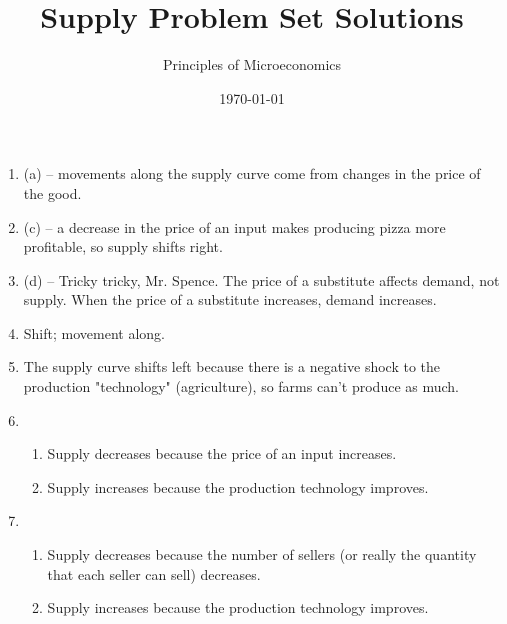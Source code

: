 \documentclass{article}
\title{Supply Problem Set Solutions}
\author{Principles of Microeconomics}
\date{\today}
\begin{document}
\maketitle

\begin{enumerate}

\item (a) -- movements along the supply curve come from changes in the price of the good.

\item (c) -- a decrease in the price of an input makes producing pizza more profitable, so supply shifts right.

\item (d) -- Tricky tricky, Mr. Spence. The price of a substitute affects demand, not supply. When the price of a substitute increases, demand increases.

\item Shift; movement along.

\item The supply curve shifts left because there is a negative shock to the production "technology" (agriculture), so farms can't produce as much. 

\item

	\begin{enumerate}
	
	\item Supply decreases because the price of an input increases.
	
	\item Supply increases because the production technology improves. 
	
	\end{enumerate}
	
\item

	\begin{enumerate}
	
	\item Supply decreases because the number of sellers (or really the quantity that each seller can sell) decreases. 
	
	\item Supply increases because the production technology improves. 
	
	\end{enumerate}

\end{enumerate}
\end{document}
